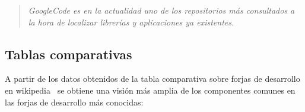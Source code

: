 \begin{quote}
    \emph{GoogleCode es en la actualidad uno de los repositorios más consultados a la hora de localizar librerías y aplicaciones ya existentes.}
\end{quote}


\subsection{Tablas comparativas}
\label{sub:comparativa}

\par A partir de los datos obtenidos de la tabla comparativa sobre forjas de desarrollo en wikipedia~ \cite{comparativa-forjas-wiki} se obtiene una visión más amplia de los componentes comunes en las forjas de desarrollo más conocidas:

